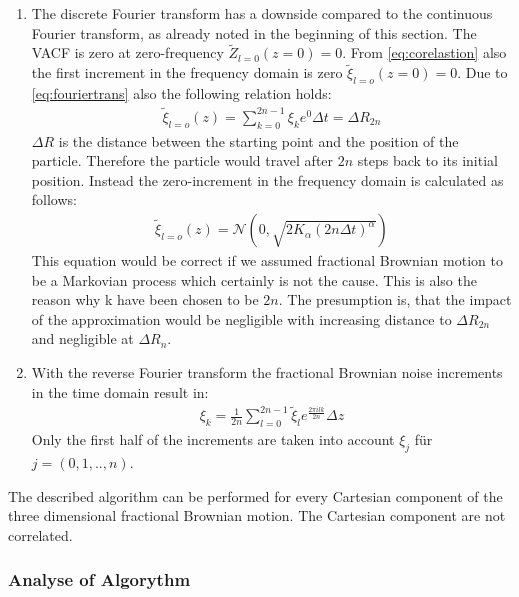 \documentclass[
  a4paper,BCOR10mm,oneside,
  bibtotoc,idxtotoc,
  headsepline,footsepline,%
  fleqn,openbib
]{scrbook}
\begin{document}
\begin{enumerate}
 \item The discrete Fourier transform has a downside compared to the continuous Fourier transform, as already noted in the beginning of this section. The VACF is zero at zero-frequency $ \tilde{Z}_{l=0}(z=0)=0$.  From \cref{eq:corelastion} also the first increment in the frequency domain is zero $ \tilde{\xi}_{l=o}(z=0)= 0$. Due to \cref{eq:fouriertrans} also the following relation holds:
 \begin{align}
   \tilde{\xi}_{l=o}(z) = \sum_{k=0}^{2n-1} \xi_k e^{0} \Delta t = \Delta  R_{2n}
 \end{align}
$\Delta R $ is the distance between the starting point and the position of the particle. Therefore the particle would travel after $2n$ steps back to its initial position. Instead the zero-increment in the frequency domain is calculated as follows:
\begin{align}
 \tilde{\xi}_{l=o}(z) = \mathcal{N}(0,\sqrt{2 K_{\alpha} (2n \Delta t)^\alpha})
\end{align}
 This equation would be correct if we assumed fractional Brownian motion to be a Markovian process which certainly is not the cause. This is also the reason why k have been chosen to be $2n$. The presumption is, that the impact of the approximation would be negligible with increasing distance to $\Delta R_{2n}$ and negligible at $\Delta R_{n}$.  
 \item With the reverse Fourier transform the fractional Brownian noise increments in the time domain result in:
 \begin{align}
 \xi_{k}= \frac{1}{2n} \sum_{l=0}^{2n-1}  \tilde{\xi}_l e^{\frac{2 \pi i l k }{2n}} \Delta z
 \end{align}
Only the first half of the increments are taken  into account $\xi_{j}$ für $j=(0,1,..,n)$.
\end{enumerate}
The described algorithm can be performed for every Cartesian component of the three dimensional fractional Brownian motion. The Cartesian component are not correlated.
\subsubsection{Analyse of Algorythm}
\end{document}
